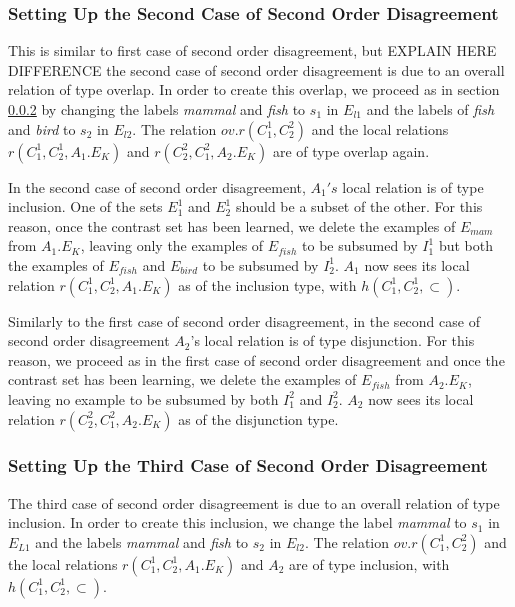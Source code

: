 \subsubsection{Setting Up the Second Case of Second Order Disagreement}

This is similar to first case of second order disagreement, but EXPLAIN HERE DIFFERENCE the second case of second order disagreement is due to an overall relation of type overlap. In order to create this overlap, we proceed as in section \ref{} by changing the labels \emph{mammal} and \emph{fish} to $s_{1}$ in $E_{l1}$ and the labels of \emph{fish} and \emph{bird} to $s_{2}$ in $E_{l2}$. The relation $ov.r(C_{1}^{1}, C_{2}^{2})$ and the local relations $r(C_{1}^{1},C_{2}^{1},A_{1}.E_{K})$ and $r(C_{2}^{2},C_{1}^{2},A_{2}.E_{K})$ are of type overlap again.

In the second case of second order disagreement, $A_{1}'s$ local relation is of type inclusion. One of the sets $E_{1}^{1}$ and $E_{2}^{1}$ should be a subset of the other. For this reason, once the contrast set has been learned, we delete the examples of $E_{mam}$ from $A_{1}.E_{K}$, leaving only the examples of $E_{fish}$ to be subsumed by $I_{1}^{1}$ but both the examples of $E_{fish}$ and $E_{bird}$ to be subsumed by $I_{2}^{1}$. $A_{1}$ now sees its local relation $r(C_{1}^{1},C_{2}^{1},A_{1}.E_{K})$ as of the inclusion type, with $h(C_{1}^{1},C_{2}^{1}, \subset)$.

Similarly to the first case of second order disagreement, in the second case of second order disagreement $A_{2}$'s local relation is of type disjunction. For this reason, we proceed as in the first case of second order disagreement and once the contrast set has been learning, we delete the examples of $E_{fish}$ from $A_{2}.E_{K}$, leaving no example to be subsumed by both $I_{1}^{2}$ and $I_{2}^{2}$. $A_{2}$ now sees its local relation $r(C_{2}^{2},C_{1}^{2},A_{2}.E_{K})$ as of the disjunction type.
 
\subsubsection{Setting Up the Third Case of Second Order Disagreement}

The third case of second order disagreement is due to an overall relation of type inclusion. In order to create this inclusion, we change the label \emph{mammal} to $s_{1}$ in $E_{L1}$ and the labels  \emph{mammal} and \emph{fish} to $s_{2}$ in $E_{l2}$. The relation $ov.r(C_{1}^{1}, C_{2}^{2})$ and the local relations $r(C_{1}^{1},C_{2}^{1},A_{1}.E_{K})$ and $A_{2}$ are of type inclusion, with $h(C_{1}^{1},C_{2}^{1}, \subset)$.

